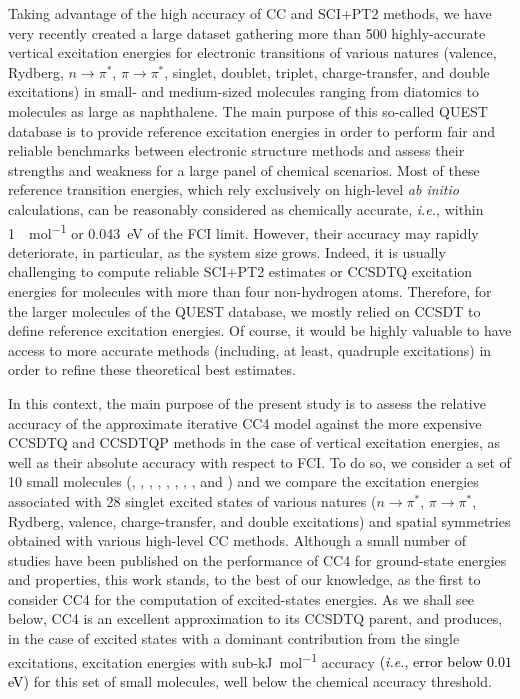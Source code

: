 \documentclass[aip,jcp,reprint,noshowkeys,superscriptaddress]{revtex4-1}
\newcommand{\alert}[1]{\textcolor{black}{#1}}
\newcommand{\ie}{\textit{i.e.}}
\newcommand{\npis}{n \to \pi^*}
\newcommand{\pipis}{\pi \to \pi^*}
\begin{document}
Taking advantage of the high accuracy of CC and SCI+PT2 methods, we have very recently created a large dataset gathering more than 500 highly-accurate vertical excitation energies for electronic transitions of various natures (valence, Rydberg, $\npis$, $\pipis$, singlet, doublet, triplet, charge-transfer, and double excitations) in small- and medium-sized molecules ranging from diatomics to molecules as large as naphthalene. \cite{Loos_2018a,Loos_2019,Loos_2020a,Loos_2020b,Loos_2020c,Veril_2021}
The main purpose of this so-called QUEST database is to provide reference excitation energies in order to perform fair and reliable benchmarks between electronic structure methods and assess their strengths and weakness for a large panel of chemical scenarios.
Most of these reference transition energies, which rely exclusively on high-level \textit{ab initio} calculations, can be reasonably considered as chemically accurate, \ie, within \SI{1}{\kcal\per\mol} or \SI{0.043}{\eV} of the FCI limit.
However, their accuracy may rapidly deteriorate, in particular, as the system size grows.
Indeed, it is usually challenging to compute reliable SCI+PT2 estimates or CCSDTQ excitation energies for molecules with more than four non-hydrogen atoms.
Therefore, for the larger molecules of the QUEST database, we mostly relied on CCSDT to define reference excitation energies.
Of course, it would be highly valuable to have access to more accurate methods (including, at least, quadruple excitations) in order to refine these theoretical best estimates.

In this context, the main purpose of the present study is to assess the relative accuracy of the approximate iterative CC4 model against the more expensive CCSDTQ and CCSDTQP methods in the case of vertical excitation energies, as well as their absolute accuracy with respect to FCI.
To do so, we consider a set of 10 small molecules (, , , , , , , ,  and ) and we compare the excitation energies associated with 28 singlet excited states of various natures ($\npis$, $\pipis$, Rydberg, valence, charge-transfer, and double excitations) and spatial symmetries obtained with various high-level CC methods.
Although a small number of studies have been published on the performance of CC4 for ground-state energies and properties, \cite{Kallay_2005,Matthews_2021} this work stands, to the best of our knowledge, as the first to consider CC4 for the computation of excited-states energies.
As we shall see below, CC4 is an excellent approximation to its CCSDTQ parent, and produces, in the case of excited states with a dominant contribution from the single excitations, excitation energies with sub-\si{\kJ\per\mol} accuracy \alert{(\textit{i.e.}, error below $0.01$ eV)} for this set of small molecules, well below the chemical accuracy threshold.
\end{document}
